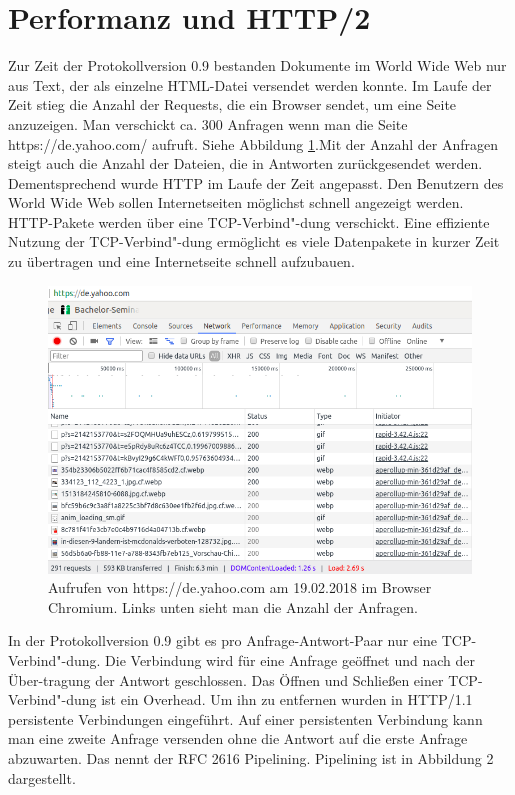 \documentclass{llncs}
\begin{document}
\section{Performanz und HTTP/2}
Zur Zeit der Protokollversion 0.9 bestanden Dokumente im World Wide Web nur aus Text, der als einzelne HTML-Datei versendet werden konnte. Im Laufe der Zeit stieg die Anzahl der Requests, die ein Browser sendet, um eine Seite anzuzeigen. Man verschickt ca. 300 Anfragen wenn man die Seite https://de.yahoo.com/ aufruft. Siehe Abbildung \ref{fig:yahoo}.\newline Mit der Anzahl der Anfragen steigt auch die Anzahl der Dateien, die in Antworten zurückgesendet werden. Dementsprechend wurde HTTP im Laufe der Zeit angepasst. Den Benutzern des World Wide Web sollen Internetseiten möglichst schnell angezeigt werden.
HTTP-Pakete werden über eine TCP-Verbind"-dung verschickt. Eine effiziente Nutzung der TCP-Verbind"-dung ermöglicht es viele Datenpakete in kurzer Zeit zu übertragen und eine Internetseite schnell aufzubauen.
\begin{figure}[!ht]
\includegraphics[width=\columnwidth]{yahooRequests}
\caption{Aufrufen von https://de.yahoo.com am 19.02.2018 im Browser Chromium. Links unten sieht man die Anzahl der Anfragen.}
\label{fig:yahoo}
\end{figure}


In der Protokollversion 0.9 gibt es pro Anfrage-Antwort-Paar nur eine TCP-Verbind"-dung. Die Verbindung wird für eine Anfrage geöffnet und nach der Über-tragung der Antwort geschlossen. Das Öffnen und Schließen einer TCP-Verbind"-dung ist ein Overhead. Um ihn zu entfernen wurden in HTTP/1.1 persistente Verbindungen eingeführt. Auf einer persistenten Verbindung kann man eine zweite Anfrage versenden ohne die Antwort auf die erste Anfrage abzuwarten. Das nennt der RFC 2616 Pipelining. Pipelining ist in Abbildung 2 dargestellt.
\end{document}
